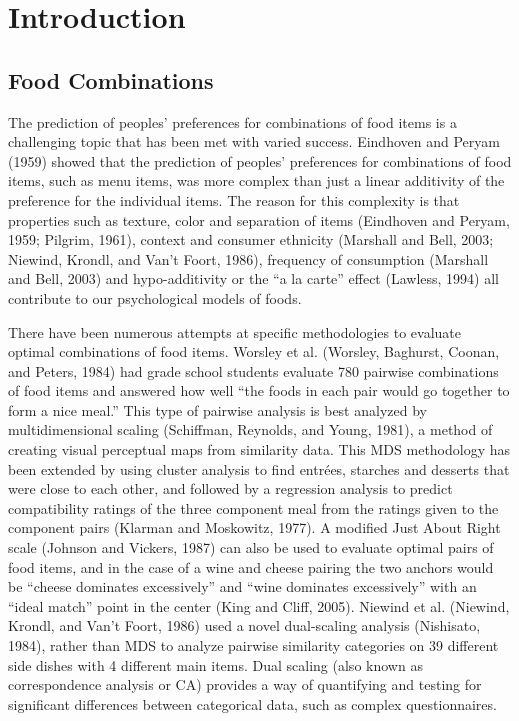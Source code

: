 \chapter{Introduction}

\section{Food Combinations}
The prediction of peoples’ preferences for combinations of food items is a challenging topic that has been met with varied success.  Eindhoven and Peryam (1959) showed that the prediction of peoples’ preferences for combinations of food items, such as menu items, was more complex than just a linear additivity of the preference for the individual items.  The reason for this complexity is that properties such as texture, color and separation of items \citep{Eindhoven1959} (Eindhoven and Peryam, 1959; Pilgrim, 1961), context and consumer ethnicity (Marshall and Bell, 2003; Niewind, Krondl, and Van't Foort, 1986), frequency of consumption (Marshall and Bell, 2003) and hypo-additivity or the “a la carte” effect (Lawless, 1994) all contribute to our psychological models of foods.  

There have been numerous attempts at specific methodologies to evaluate optimal combinations of food items.  Worsley et al. (Worsley, Baghurst, Coonan, and Peters, 1984) had grade school students evaluate 780 pairwise combinations of food items and answered how well “the foods in each pair would go together to form a nice meal.” This type of pairwise analysis is best analyzed by multidimensional scaling (Schiffman, Reynolds, and Young, 1981), a method of creating visual perceptual maps from similarity data. This MDS methodology has been extended by using cluster analysis to find entr\'{e}es, starches and desserts that were close to each other, and followed by a regression analysis to predict compatibility ratings of the three component meal from the ratings given to the component pairs (Klarman and Moskowitz, 1977).  A modified Just About Right scale (Johnson and Vickers, 1987) can also be used to evaluate optimal pairs of food items, and in the case of a wine and cheese pairing the two anchors would be “cheese dominates excessively” and “wine dominates excessively” with an “ideal match” point in the center (King and Cliff, 2005).  Niewind et al. (Niewind, Krondl, and Van't Foort, 1986) used a novel dual-scaling analysis (Nishisato, 1984), rather than MDS to analyze pairwise similarity categories on 39 different side dishes with 4 different main items.  Dual scaling (also known as correspondence analysis or CA) provides a way of quantifying and testing for significant differences between categorical data, such as complex questionnaires.

